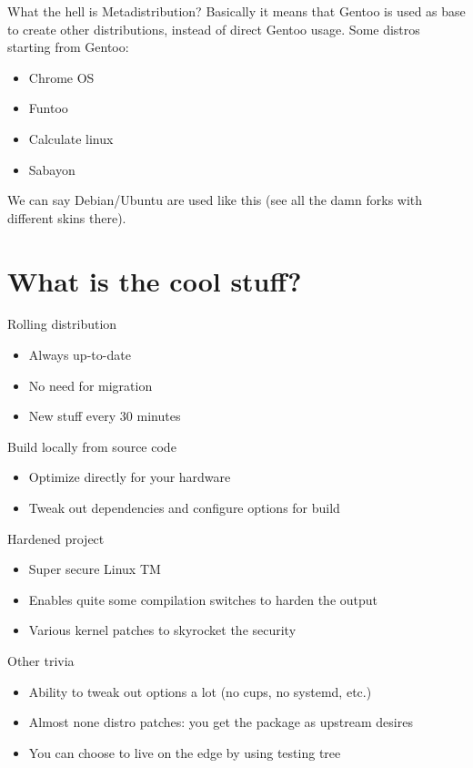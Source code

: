\documentclass{beamer}
\begin{document}
\begin{frame}{What the hell is Metadistribution?}
	Basically it means that Gentoo is used as base to create other distributions, instead of direct Gentoo usage.
	Some distros starting from Gentoo:
	\begin{itemize}
		\item Chrome OS
		\item Funtoo
		\item Calculate linux
		\item Sabayon
	\end{itemize}
	We can say Debian/Ubuntu are used like this (see all the damn forks with different skins there).
\end{frame}

\section{What is the cool stuff?}
\begin{frame}{Rolling distribution}
	\begin{itemize}
		\item Always up-to-date
		\item No need for migration
		\item New stuff every 30 minutes
	\end{itemize}
\end{frame}

\begin{frame}{Build locally from source code}
	\begin{itemize}
		\item Optimize directly for your hardware
		\item Tweak out dependencies and configure options for build
	\end{itemize}
\end{frame}

\begin{frame}{Hardened project}
	\begin{itemize}
		\item Super secure Linux TM
		\item Enables quite some compilation switches to harden the output
		\item Various kernel patches to skyrocket the security
	\end{itemize}
\end{frame}

\begin{frame}{Other trivia}
	\begin{itemize}
		\item Ability to tweak out options a lot (no cups, no systemd, etc.)
		\item Almost none distro patches: you get the package as upstream desires
		\item You can choose to live on the edge by using testing tree
	\end{itemize}
\end{frame}
\end{document}
